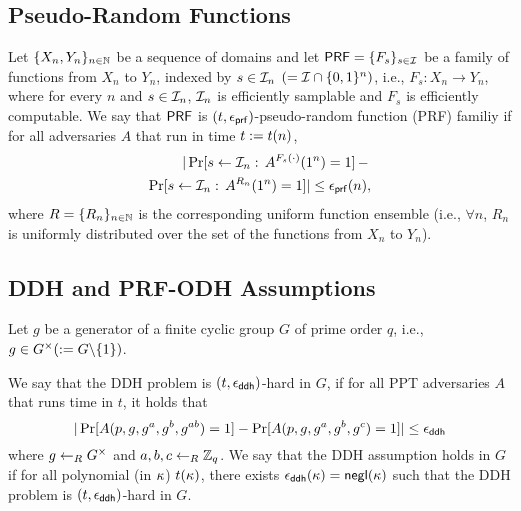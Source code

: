 \subsection{Pseudo-Random Functions} \label{sec:prf}
Let $\{X_n,Y_n\}_{n \in \mathbb{N}}$ be a sequence of domains
and let $\mathsf{PRF} = \{F_{s}\}_{s \in \mathcal{I}}$ be a family
of functions from $X_n$ to $Y_n$, indexed by $s \in
\mathcal{I}_{n}$ $(= \mathcal{I} \cap \{0,1\}^{n})$, i.e.,
$F_{s} : X_n \to Y_n$, where for every $n$ and
$s \in \mathcal{I}_n$, $\mathcal{I}_n$ is efficiently samplable
and $F_s$ is efficiently computable.
We say that $\mathsf{PRF}$ is $(t,\epsilon_{\mathsf{prf}})$-pseudo-random
function (PRF) familiy if for all adversaries $A$ that
run in time $t:= t(n)$,
\begin{eqnarray}
 |\Pr[s \gets {\mathcal{I}}_{n}: \, A^{F_s(\cdot)}(1^n)=1] \, - \, \nonumber \\
 \Pr[s \gets {\mathcal{I}}_{n}: \, A^{R_n}(1^n)=1] |
 \leq \epsilon_{\mathsf{prf}}(n),
\end{eqnarray}
where $R=\{R_n\}_{n\in \mathbb{N}}$ is the corresponding uniform
function ensemble (i.e., $\forall n$, $R_n$ is uniformly
distributed over the set of the functions from $X_n$ to
$Y_n$).

\subsection{DDH and PRF-ODH Assumptions} \label{sec:assumption}
Let $g$ be a generator of a finite cyclic group $G$ of
prime order $q$, i.e.,
$g \in G^{\times}(:= G\backslash \{1\})$.

\begin{definition}
 We say that the DDH problem is $(t,\epsilon_{\mathsf{ddh}})$-hard
 in $G$, if for all PPT adversaries $A$ that runs time
 in $t$, it holds that
 \begin{equation}
  |\Pr[A(p,g,g^a,g^b,g^{ab}) = 1] - \Pr[A(p,g,g^a,g^b,g^c)
  = 1]| \leq \epsilon_{\mathsf{ddh}}
 \end{equation}
 where $g \getsr G^{\times}$ and
 $a,b,c \getsr \mathbb{Z}_{q}$.
 We say that the DDH assumption holds in $G$ if for all
 polynomial (in $\kappa$) $t(\kappa)$, there exists
 $\epsilon_{\mathsf{ddh}}(\kappa)=\mathsf{negl}(\kappa)$ such that the
 DDH problem is $(t,\epsilon_{\mathsf{ddh}})$-hard in $G$.
\end{definition}

